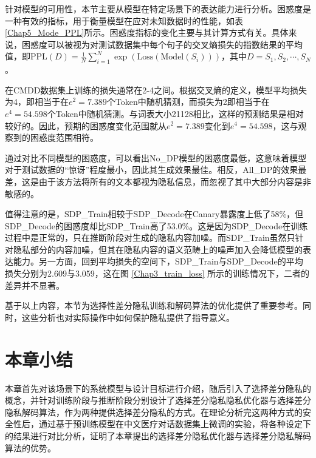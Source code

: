 针对模型的可用性，本节主要从模型在特定场景下的表达能力进行分析。困惑度是一种有效的指标，用于衡量模型在应对未知数据时的性能，如表\ref{Chap5_Mode_PPL}所示。困惑度指标的变化主要与其计算方式有关。具体来说，困惑度可以被视为对测试数据集中每个句子的交叉熵损失的指数结果的平均值，即$\text{PPL}(D)=\frac{1}{N}\sum_{i=1}^{N}\exp(\text{Loss}(\text{Model}(S_i)))$，其中$D={S_1,S_2,\cdots, S_N}$。

在CMDD数据集上训练的损失通常在2-4之间。根据交叉熵的定义，模型平均损失为4，即相当于在$e^2=7.389$个Token中随机猜测，而损失为2即相当于在$e^4=54.598$个Token中随机猜测。与词表大小21128相比，这样的预测结果是相对较好的。因此，预期的困惑度变化范围就从$e^2=7.389$变化到$e^4=54.598$，这与观察到的困惑度范围相符。

通过对比不同模型的困惑度，可以看出No\_DP模型的困惑度最低，这意味着模型对于测试数据的“惊讶”程度最小，因此其生成效果最佳。相反，All\_DP的效果最差，这是由于该方法将所有的文本都视为隐私信息，而忽视了其中大部分内容是非敏感的。

值得注意的是，SDP\_Train相较于SDP\_Decode在Canary暴露度上低了58\%，但SDP\_Decode的困惑度却比SDP\_Train高了53.0\%。这是因为SDP\_Decode在训练过程中是正常的，只在推断阶段对生成的隐私内容加噪。而SDP\_Train虽然只针对隐私部分的内容加噪，但其在隐私内容的语义范畴上的噪声加入会降低模型的表达能力。另一方面，回到平均损失的空间下，SDP\_Train与SDP\_Decode的平均损失分别为2.609与3.059，这在图 \ref{Chap3_train_loss} 所示的训练情况下，二者的差异并不显著。

基于以上内容，本节为选择性差分隐私训练和解码算法的优化提供了重要参考。同时，这些分析也对实际操作中如何保护隐私提供了指导意义。

%




\section{本章小结}



本章首先对该场景下的系统模型与设计目标进行介绍，随后引入了选择差分隐私的概念，并针对训练阶段与推断阶段分别设计了选择差分隐私隐私优化器与选择差分隐私解码算法，作为两种提供选择差分隐私的方式。在理论分析完这两种方式的安全性后，通过基于预训练模型在中文医疗对话数据集上微调的实验，将各种设定下的结果进行对比分析，证明了本章提出的选择差分隐私优化器与选择差分隐私解码算法的优势。